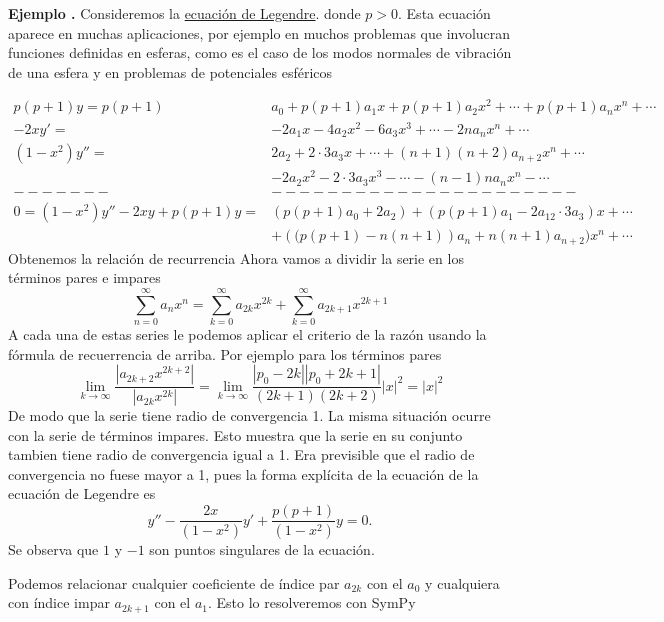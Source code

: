 \documentclass{article}
\newcounter{ejemplo_cont}
\newenvironment{ejemplo}{\noindent\textbf{Ejemplo  \arabic{ejemplo_cont}.} }{\addtocounter{ejemplo_cont}{1}}
\begin{document}
\begin{ejemplo} Consideremos la \href{http://es.wikipedia.org/wiki/Polinomios_de_Legendre}{ecuación de Legendre}.
donde $p>0$. Esta ecuación aparece en muchas aplicaciones, por ejemplo en muchos problemas que involucran funciones definidas en esferas, como es el caso de los modos normales de vibración de una esfera y en problemas de potenciales esféricos

\[\begin{split}
   p(p+1)y= p(p+1)&a_0+ p(p+1)a_1x+ p(p+1)a_2x^2+\cdots+ p(p+1)a_nx^n+\cdots\\
  -2xy'=&-2a_1x-4a_2x^2-6a_3x^3+\cdots-2na_{n}x^n+\cdots\\
(1-x^2)y''=& 2a_2+2\cdot 3a_3x+\cdots +(n+1)(n+2)a_{n+2}x^n+\cdots\\
          &-2a_2x^2-2\cdot 3a_3x^3-\cdots -(n-1)na_{n}x^n-\cdots\\
     -------&----------------------\\
0=(1-x^2)y''-2xy+p(p+1)y =& (p(p+1)a_0+2a_2)+(p(p+1)a_1-2a_12\cdot 3a_3)x+\cdots\\
     &+ \left( (p(p+1)-n(n+1)\right)a_n+n(n+1)a_{n+2})x^n+\cdots
  \end{split}
\]
Obtenemos la relación de recurrencia
 Ahora vamos a dividir la serie en los términos pares e impares
\[\sum\limits_{n=0}^{\infty}a_nx^n= \sum\limits_{k=0}^{\infty}a_{2k}x^{2k}+\sum\limits_{k=0}^{\infty}a_{2k+1}x^{2k+1}\]
A cada una de estas series le podemos aplicar el criterio de la razón usando la fórmula de recuerrencia de arriba. Por ejemplo para los términos pares
\[\lim\limits_{k\to\infty}\frac{|a_{2k+2}x^{2k+2}|}{|a_{2k}x^{2k}|}=\lim\limits_{k\to\infty}\frac{|p_0-2k||p_0+2k+1|}{(2k+1)(2k+2)}|x|^2=|x|^2\]
De modo que la serie tiene radio de convergencia 1. La misma situación ocurre con la serie de términos impares. Esto muestra que la serie en su conjunto tambien tiene radio de convergencia igual a 1. Era previsible que el radio de convergencia no fuese mayor a 1, pues la forma explícita de la ecuación de la ecuación de Legendre es
\[y''-\frac{2x}{(1-x^2)}y'+\frac{p(p+1)}{(1-x^2)}y=0.\]
Se observa que $1$ y $-1$ son puntos singulares de la ecuación.

Podemos relacionar cualquier coeficiente de índice par $a_{2k}$ con el $a_0$ y cualquiera con índice impar $a_{2k+1}$ con el $a_1$. Esto lo resolveremos con SymPy


\end{ejemplo}
\end{document}
